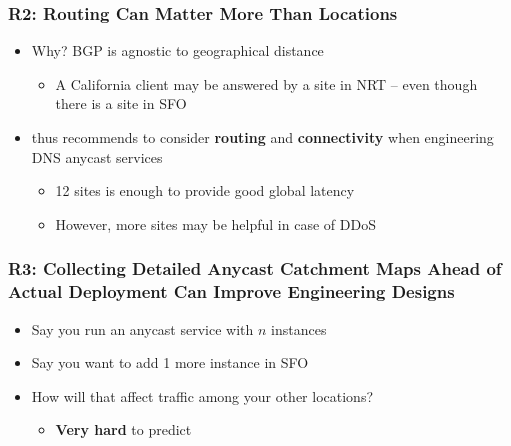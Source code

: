 \documentclass[11pt,show 
notes,notheorems,noamsthm,blank]{beamer} %
\begin{document}
\begin{frame}
 \frametitle{R2: Routing Can Matter More Than Locations}
 
\begin{itemize}
 \item Why? BGP is agnostic to geographical distance
 \begin{itemize}
  \item A California client may be answered by a site in NRT -- even 
though there is a site in SFO
 \end{itemize}

 \item \cite{Schmidt17a} thus recommends to consider \textbf{routing} and 
\textbf{connectivity} 
when engineering DNS anycast services

\begin{itemize}


 \item 12 sites is enough to provide good global latency 
 \item However, more sites may be helpful in case of DDoS~\cite{Moura16b}
\end{itemize}
\end{itemize}

\end{frame}

\begin{frame}
 \frametitle{R3: Collecting Detailed Anycast Catchment Maps Ahead of Actual
    Deployment Can Improve Engineering Designs}
    
    \begin{itemize}
     \item Say you run an anycast service with $n$  instances
     \item  Say you want to add 1 more  instance in SFO
     \item How will that affect traffic among your other locations?
      \begin{itemize}
       \item \textbf{Very hard} to predict
      \end{itemize}

    \end{itemize}

    
\end{frame}
\end{document}
